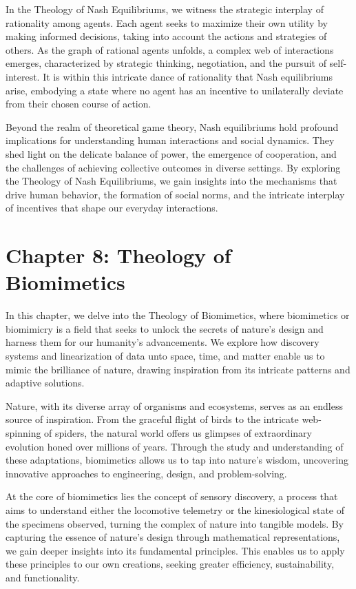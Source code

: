 \documentclass[ebook,12pt,oneside,openany]{memoir}
\begin{document}
\indent In the Theology of Nash Equilibriums, we witness the strategic interplay of rationality among agents. Each agent seeks to maximize their own utility by making informed decisions, taking into account the actions and strategies of others. As the graph of rational agents unfolds, a complex web of interactions emerges, characterized by strategic thinking, negotiation, and the pursuit of self-interest. It is within this intricate dance of rationality that Nash equilibriums arise, embodying a state where no agent has an incentive to unilaterally deviate from their chosen course of action.

\indent Beyond the realm of theoretical game theory, Nash equilibriums hold profound implications for understanding human interactions and social dynamics. They shed light on the delicate balance of power, the emergence of cooperation, and the challenges of achieving collective outcomes in diverse settings. By exploring the Theology of Nash Equilibriums, we gain insights into the mechanisms that drive human behavior, the formation of social norms, and the intricate interplay of incentives that shape our everyday interactions.
\chapter*{Chapter 8: Theology of Biomimetics}


\indent \indent In this chapter, we delve into the Theology of Biomimetics, where biomimetics or biomimicry is a field that seeks to unlock the secrets of nature's design and harness them for our humanity’s advancements. We explore how discovery systems and linearization of data unto space, time, and matter enable us to mimic the brilliance of nature, drawing inspiration from its intricate patterns and adaptive solutions.

\indent Nature, with its diverse array of organisms and ecosystems, serves as an endless source of inspiration. From the graceful flight of birds to the intricate web-spinning of spiders, the natural world offers us glimpses of extraordinary evolution honed over millions of years. Through the study and understanding of these adaptations, biomimetics allows us to tap into nature's wisdom, uncovering innovative approaches to engineering, design, and problem-solving.

\indent At the core of biomimetics lies the concept of sensory discovery, a process that aims to understand either the locomotive telemetry or the kinesiological state of the specimens observed, turning the complex of nature into tangible models. By capturing the essence of nature's design through mathematical representations, we gain deeper insights into its fundamental principles. This enables us to apply these principles to our own creations, seeking greater efficiency, sustainability, and functionality.
\end{document}
